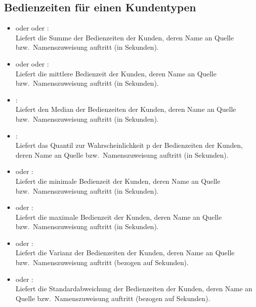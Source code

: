 \subsection{Bedienzeiten für einen Kundentypen}

\begin{itemize}

\item
{} oder  oder :\\
Liefert die Summe der Bedienzeiten der Kunden, deren Name an Quelle bzw.\ Namenszuweisung  auftritt (in Sekunden).

\item
{} oder  oder :\\
Liefert die mittlere Bedienzeit der Kunden, deren Name an Quelle bzw.\ Namenszuweisung  auftritt (in Sekunden).

\item
{}:\\
Liefert den Median der Bedienzeiten der Kunden, deren Name an Quelle bzw.\ Namenszuweisung  auftritt (in Sekunden).

\item
{}:\\
Liefert das Quantil zur Wahrscheinlichkeit p der Bedienzeiten der Kunden, deren Name an Quelle bzw.\ Namenszuweisung  auftritt (in Sekunden).

\item
{} oder :\\
Liefert die minimale Bedienzeit der Kunden, deren Name an Quelle bzw.\ Namenszuweisung  auftritt (in Sekunden).

\item
{} oder :\\
Liefert die maximale Bedienzeit der Kunden, deren Name an Quelle bzw.\ Namenszuweisung  auftritt (in Sekunden).

\item
{} oder :\\
Liefert die Varianz der Bedienzeiten der Kunden, deren Name an Quelle bzw.\ Namenszuweisung  auftritt (bezogen auf Sekunden).

\item
{} oder :\\
Liefert die Standardabweichung der Bedienzeiten der Kunden, deren Name an Quelle bzw.\ Namenszuweisung  auftritt (bezogen auf Sekunden).


\end{itemize}
